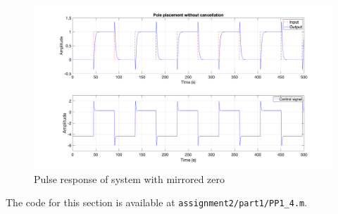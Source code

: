 \begin{figure}
	\centering
	\includegraphics[width=\textwidth]{images/pp43.png}
	\caption{Pulse response of system with mirrored zero}
	\label{fig:pp43}
\end{figure}

\noindent The code  for this section is available at \lstinline|assignment2/part1/PP1_4.m|. 

